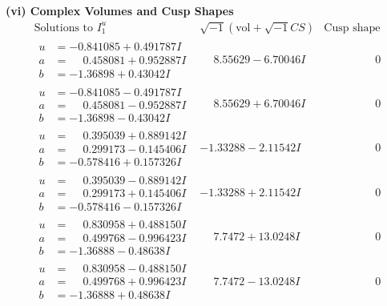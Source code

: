\documentclass[1p]{elsarticle_modified}
\theoremstyle{definition}
\newcommand{\I}{\sqrt{-1}}
\begin{document}
\newpage\flushleft \textbf{(vi) Complex Volumes and Cusp Shapes}
$$\begin{array}{c|c|c}  
\text{Solutions to }I^u_{1}& \I (\text{vol} + \sqrt{-1}CS) & \text{Cusp shape}\\
 \hline 
\begin{aligned}
u &= -0.841085 + 0.491787 I \\
a &= \phantom{-}0.458081 + 0.952887 I \\
b &= -1.36898 + 0.43042 I\end{aligned}
 & \phantom{-}8.55629 - 6.70046 I & \phantom{-0.000000 } 0 \\ \hline\begin{aligned}
u &= -0.841085 - 0.491787 I \\
a &= \phantom{-}0.458081 - 0.952887 I \\
b &= -1.36898 - 0.43042 I\end{aligned}
 & \phantom{-}8.55629 + 6.70046 I & \phantom{-0.000000 } 0 \\ \hline\begin{aligned}
u &= \phantom{-}0.395039 + 0.889142 I \\
a &= \phantom{-}0.299173 - 0.145406 I \\
b &= -0.578416 + 0.157326 I\end{aligned}
 & -1.33288 - 2.11542 I & \phantom{-0.000000 } 0 \\ \hline\begin{aligned}
u &= \phantom{-}0.395039 - 0.889142 I \\
a &= \phantom{-}0.299173 + 0.145406 I \\
b &= -0.578416 - 0.157326 I\end{aligned}
 & -1.33288 + 2.11542 I & \phantom{-0.000000 } 0 \\ \hline\begin{aligned}
u &= \phantom{-}0.830958 + 0.488150 I \\
a &= \phantom{-}0.499768 - 0.996423 I \\
b &= -1.36888 - 0.48638 I\end{aligned}
 & \phantom{-}7.7472 + 13.0248 I & \phantom{-0.000000 } 0 \\ \hline\begin{aligned}
u &= \phantom{-}0.830958 - 0.488150 I \\
a &= \phantom{-}0.499768 + 0.996423 I \\
b &= -1.36888 + 0.48638 I\end{aligned}
 & \phantom{-}7.7472 - 13.0248 I & \phantom{-0.000000 } 0 \\ \hline\begin{aligned}

\end{aligned}
\end{array}$$
\end{document}

